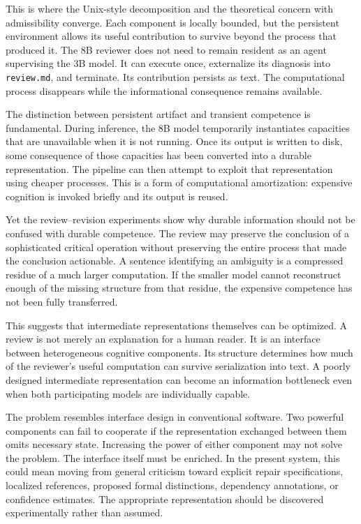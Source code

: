\documentclass[11pt]{article}
\begin{document}
This is where the Unix-style decomposition and the theoretical concern with admissibility converge. Each component is locally bounded, but the persistent environment allows its useful contribution to survive beyond the process that produced it. The 8B reviewer does not need to remain resident as an agent supervising the 3B model. It can execute once, externalize its diagnosis into \texttt{review.md}, and terminate. Its contribution persists as text. The computational process disappears while the informational consequence remains available.

The distinction between persistent artifact and transient competence is fundamental. During inference, the 8B model temporarily instantiates capacities that are unavailable when it is not running. Once its output is written to disk, some consequence of those capacities has been converted into a durable representation. The pipeline can then attempt to exploit that representation using cheaper processes. This is a form of computational amortization: expensive cognition is invoked briefly and its output is reused.

Yet the review--revision experiments show why durable information should not be confused with durable competence. The review may preserve the conclusion of a sophisticated critical operation without preserving the entire process that made the conclusion actionable. A sentence identifying an ambiguity is a compressed residue of a much larger computation. If the smaller model cannot reconstruct enough of the missing structure from that residue, the expensive competence has not been fully transferred.

This suggests that intermediate representations themselves can be optimized. A review is not merely an explanation for a human reader. It is an interface between heterogeneous cognitive components. Its structure determines how much of the reviewer's useful computation can survive serialization into text. A poorly designed intermediate representation can become an information bottleneck even when both participating models are individually capable.

The problem resembles interface design in conventional software. Two powerful components can fail to cooperate if the representation exchanged between them omits necessary state. Increasing the power of either component may not solve the problem. The interface itself must be enriched. In the present system, this could mean moving from general criticism toward explicit repair specifications, localized references, proposed formal distinctions, dependency annotations, or confidence estimates. The appropriate representation should be discovered experimentally rather than assumed.
\end{document}
